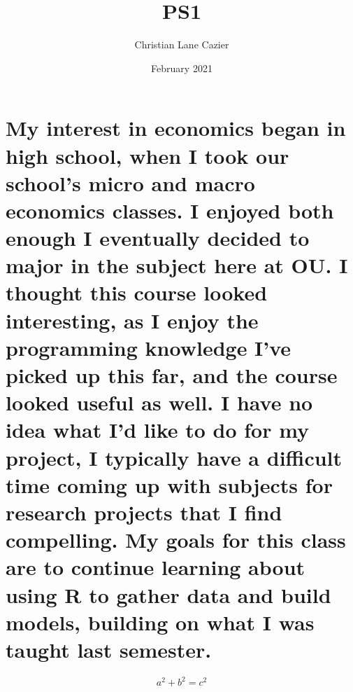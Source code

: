 \documentclass{article}
\title{PS1}
\author{Christian Lane Cazier}
\date{February 2021}
\begin{document}
\maketitle

\section{My interest in economics began in high school, when I took our school's micro and macro economics classes. I enjoyed both enough I eventually decided to major in the subject here at OU. I thought this course looked interesting, as I enjoy the programming knowledge I've picked up this far, and the course looked useful as well. I have no idea what I'd like to do for my project, I typically have a difficult time coming up with subjects for research projects that I find compelling. My goals for this class are to continue learning about using R to gather data and build models, building on what I was taught last semester.}

\begin{equation}
    a^2 + b^2 = c^2
\end{equation}
\end{document}
